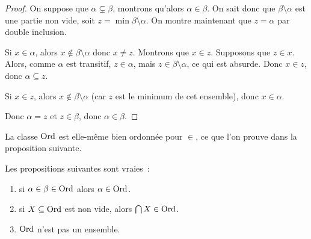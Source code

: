 \begin{proof}
  On suppose que $\alpha \subsetneq \beta$, montrons qu'alors
  $\alpha \in \beta$. On sait donc que $\beta\setminus\alpha$ est une partie
  non vide, soit $z = \min \beta\setminus\alpha$. On montre maintenant que
  $z = \alpha$ par double inclusion.

  Si $x\in \alpha$, alors $x\notin\beta\setminus\alpha$ donc $x\neq z$. Montrons
  que $x\in z$. Supposons que $z\in x$. Alors, comme $\alpha$ est transitif,
  $z\in \alpha$, mais $z\in\beta\setminus\alpha$, ce qui est absurde. Donc
  $x\in z$, donc $\alpha\subseteq z$.

  Si $x\in z$, alors $x\notin\beta\setminus\alpha$ (car $z$ est le minimum de
  cet ensemble), donc $x\in\alpha$.

  Donc $\alpha = z$ et $z\in \beta$, donc $\alpha \in \beta$.
\end{proof}

La classe $\operatorname{Ord}$ est elle-même bien ordonnée pour $\in$, ce que l'on prouve dans
la proposition suivante.

\begin{proposition}
  Les propositions suivantes sont vraies~:
  \begin{enumerate}
  \item si $\alpha \in \beta \in \operatorname{Ord}$ alors $\alpha \in \operatorname{Ord}$.
  \item si $X\subseteq \operatorname{Ord}$ est non vide, alors $\bigcap X \in \operatorname{Ord}$.
  \item $\operatorname{Ord}$ n'est pas un ensemble.
  \end{enumerate}
\end{proposition}

